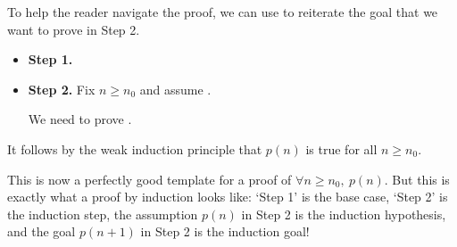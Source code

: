 To help the reader navigate the proof, we can use  to reiterate the goal that we want to prove in Step 2.

\begin{snippet}
\begin{itemize}
\item \textbf{Step 1.} 
\item \textbf{Step 2.} Fix $n \ge n_0$ and assume . 

We need to prove .

\end{itemize}

It follows by the weak induction principle that $p(n)$ is true for all $n \ge n_0$.
\end{snippet}

This is now a perfectly good template for a proof of $\forall n \ge n_0,~ p(n)$. But this is exactly what a proof by induction looks like: `Step 1' is the base case, `Step 2' is the induction step, the assumption $p(n)$ in Step 2 is the induction hypothesis, and the goal $p(n+1)$ in Step 2 is the induction goal!
